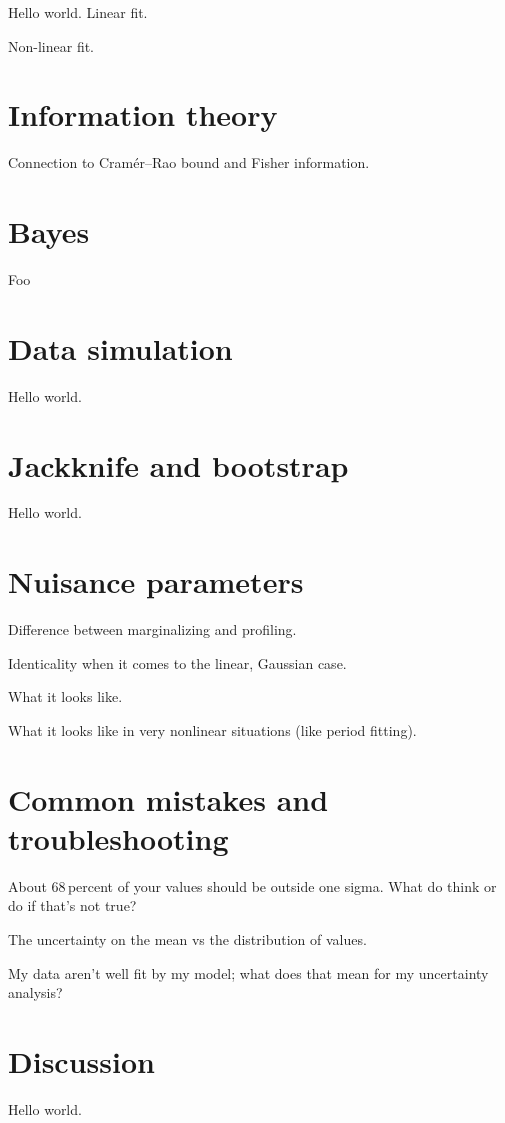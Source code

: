 \documentclass[12pt, letterpaper]{article}
\begin{document}
Hello world. Linear fit.

Non-linear fit.

\section{Information theory}

Connection to Cram\'er--Rao bound and Fisher information.

\section{Bayes}

Foo

\section{Data simulation}

Hello world.

\section{Jackknife and bootstrap}

Hello world.

\section{Nuisance parameters}

Difference between marginalizing and profiling.

Identicality when it comes to the linear, Gaussian case.

What it looks like.

What it looks like in very nonlinear situations (like period fitting).

\section{Common mistakes and troubleshooting}

About 68\,percent of your values should be outside one sigma. What do think
or do if that's not true?

The uncertainty on the mean vs the distribution of values.

My data aren't well fit by my model; what does that mean for my uncertainty
analysis?

\section{Discussion}

Hello world.
\end{document}
